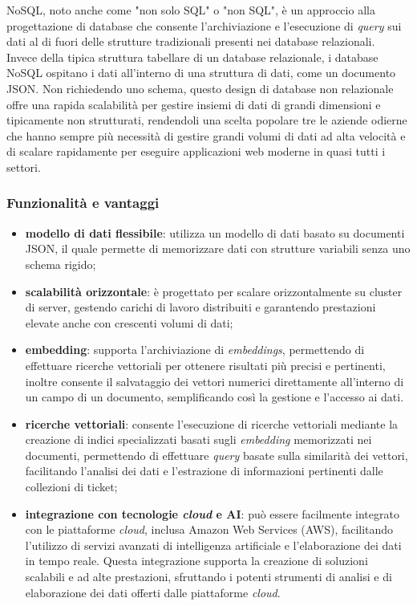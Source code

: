 NoSQL, noto anche come "non solo SQL" o "non SQL", è un approccio alla progettazione di database che consente l'archiviazione e l'esecuzione di \textit{query} sui dati al di fuori delle strutture tradizionali presenti nei database relazionali.\\
Invece della tipica struttura tabellare di un database relazionale, i database NoSQL ospitano i dati all'interno di una struttura di dati, come un documento JSON. Non richiedendo uno schema, questo design di database non relazionale offre una rapida scalabilità per gestire insiemi di dati di grandi dimensioni e tipicamente non strutturati, rendendoli una scelta popolare tre le aziende odierne che hanno sempre più necessità di gestire grandi volumi di dati ad alta velocità e di scalare rapidamente per eseguire applicazioni web moderne in quasi tutti i settori.

\subsubsection{Funzionalità e vantaggi}
\begin{itemize}
    \item \textbf{modello di dati flessibile}: utilizza un modello di dati basato su documenti JSON, il quale permette di memorizzare dati con strutture variabili senza uno schema rigido;
    \item \textbf{scalabilità orizzontale}: è progettato per scalare orizzontalmente su cluster di server, gestendo carichi di lavoro distribuiti e garantendo prestazioni elevate anche con crescenti volumi di dati;
    \item \textbf{embedding}: supporta l'archiviazione di \textit{embeddings}, permettendo di effettuare ricerche vettoriali per ottenere risultati più precisi e pertinenti, inoltre consente il salvataggio dei vettori numerici direttamente all’interno di un campo di un documento, semplificando così la gestione e l’accesso ai dati.
    \item \textbf{ricerche vettoriali}: consente l’esecuzione di ricerche vettoriali mediante la creazione di indici specializzati basati sugli \textit{embedding} memorizzati nei documenti, permettendo di effettuare \textit{query} basate sulla similarità dei vettori, facilitando l’analisi dei dati e l’estrazione di informazioni pertinenti dalle collezioni di ticket;
    \item \textbf{integrazione con tecnologie \textit{cloud} e AI}: può essere facilmente integrato con le piattaforme \textit{cloud}, inclusa Amazon Web Services (AWS), facilitando l’utilizzo di servizi avanzati di intelligenza artificiale e l’elaborazione dei dati in tempo reale. Questa integrazione supporta la creazione di soluzioni scalabili e ad alte prestazioni, sfruttando i potenti strumenti di analisi e di elaborazione dei dati offerti dalle piattaforme \textit{cloud}.
\end{itemize}

